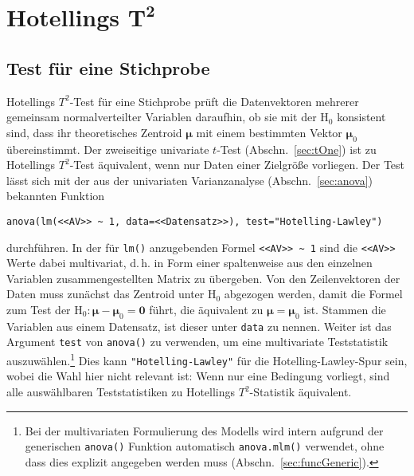 \section[Hotellings \texorpdfstring{$T^{2}$}{T2}]{Hotellings \texorpdfstring{$\bm{T^{2}}$}{T2}}
\label{sec:multHotelling}

\subsection{Test für eine Stichprobe}
\label{sec:multHotellingOne}

Hotellings $T^{2}$-Test für eine Stichprobe prüft die Datenvektoren mehrerer gemeinsam normalverteilter Variablen daraufhin, ob sie mit der $\text{H}_{0}$ konsistent sind, dass ihr theoretisches Zentroid $\bm{\mu}$ mit einem bestimmten Vektor $\bm{\mu}_{0}$ übereinstimmt. Der zweiseitige univariate $t$-Test (Abschn.\ \ref{sec:tOne}) ist zu Hotellings $T^{2}$-Test äquivalent, wenn nur Daten einer Zielgröße vorliegen. Der Test lässt sich mit der aus der univariaten Varianzanalyse (Abschn.\ \ref{sec:anova}) bekannten Funktion
\begin{lstlisting}
anova(lm(<<AV>> ~ 1, data=<<Datensatz>>), test="Hotelling-Lawley")
\end{lstlisting}

durchführen. In der für \lstinline!lm()! anzugebenden Formel \lstinline!<<AV>> ~ 1! sind die \lstinline!<<AV>>! Werte dabei multivariat, d.\,h. in Form einer spaltenweise aus den einzelnen Variablen zusammengestellten Matrix zu übergeben. Von den Zeilenvektoren der Daten muss zunächst das Zentroid unter $\text{H}_{0}$ abgezogen werden, damit die Formel zum Test der $\text{H}_{0}: \bm{\mu} - \bm{\mu}_{0} = \bm{0}$ führt, die äquivalent zu $\bm{\mu} = \bm{\mu}_{0}$ ist. Stammen die Variablen aus einem Datensatz, ist dieser unter \lstinline!data! zu nennen. Weiter ist das Argument \lstinline!test! von \lstinline!anova()! zu verwenden, um eine multivariate Teststatistik auszuwählen.\footnote{Bei der multivariaten Formulierung des Modells wird intern aufgrund der generischen \lstinline!anova()! Funktion automatisch \lstinline!anova.mlm()! verwendet, ohne dass dies explizit angegeben werden muss (Abschn.\ \ref{sec:funcGeneric}).} Dies kann \lstinline!"Hotelling-Lawley"! für die Hotelling-Lawley-Spur sein, wobei die Wahl hier nicht relevant ist: Wenn nur eine Bedingung vorliegt, sind alle auswählbaren Teststatistiken zu Hotellings $T^{2}$-Statistik äquivalent.


